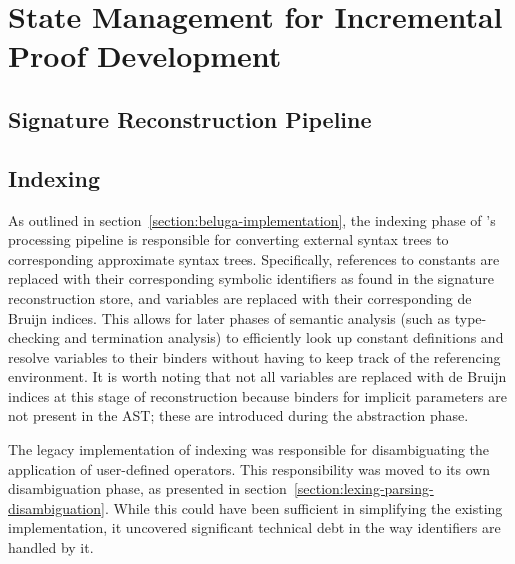 \chapter{State Management for Incremental Proof Development}


\section{Signature Reconstruction Pipeline}


\section{Indexing}\label{section:indexing}


As outlined in section~\ref{section:beluga-implementation}, the indexing phase of \Beluga's processing pipeline is responsible for converting external syntax trees to corresponding approximate syntax trees.
Specifically, references to constants are replaced with their corresponding symbolic identifiers as found in the signature reconstruction store, and variables are replaced with their corresponding de Bruijn indices.
This allows for later phases of semantic analysis (such as type-checking and termination analysis) to efficiently look up constant definitions and resolve variables to their binders without having to keep track of the referencing environment.
It is worth noting that not all variables are replaced with de Bruijn indices at this stage of reconstruction because binders for implicit parameters are not present in the \ac{AST}; these are introduced during the abstraction phase.



The legacy implementation of indexing was responsible for disambiguating the application of user-defined operators.
This responsibility was moved to its own disambiguation phase, as presented in section~\ref{section:lexing-parsing-disambiguation}.
While this could have been sufficient in simplifying the existing implementation, it uncovered significant technical debt in the way identifiers are handled by it.

